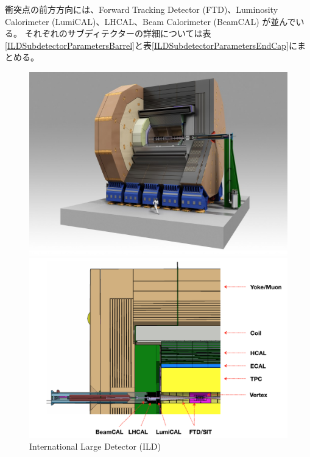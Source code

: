 衝突点の前方方向には、Forward Tracking Detector (FTD)、Luminosity Calorimeter (LumiCAL)、LHCAL、Beam Calorimeter (BeamCAL) が並んでいる。
それぞれのサブディテクターの詳細については表\ref{ILDSubdetectorParametersBarrel}と表\ref{ILDSubdetectorParametersEndCap}にまとめる。

\begin{figure}[htbp]
 \centering
 \begin{minipage}{1.0\textwidth}
  \centering
   \begin{minipage}{0.48\textwidth}
    \centering
    \includegraphics[width=1.0\textwidth, clip]{Figure/1Introduction/5-1InternationalLargeDetector.jpg}
   \end{minipage}
   \begin{minipage}{0.48\textwidth}
   \centering
    \includegraphics[width=1.0\textwidth, clip]{Figure/1Introduction/5-2InternationalLargeDetector.png}
   \end{minipage}
  \end{minipage}  
  \caption{International Large Detector (ILD) }
  \label{5-1InternationalLargeDetector}
\end{figure}

